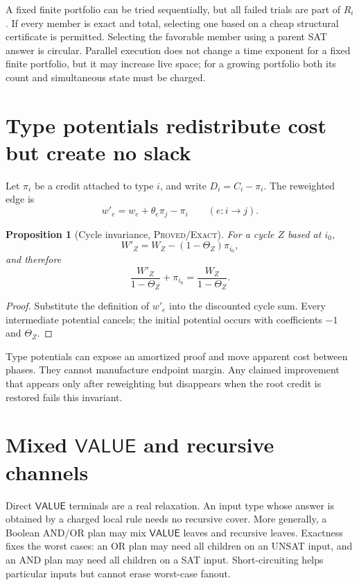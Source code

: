 \documentclass[11pt]{article}
\newtheorem{proposition}[theorem]{Proposition}
\newcommand{\VALUE}{\mathsf{VALUE}}
\begin{document}
A fixed finite portfolio can be tried sequentially, but all failed trials are
part of \(R_i\).  If every member is exact and total, selecting one based on
a cheap structural certificate is permitted.  Selecting the favorable member
using a parent SAT answer is circular.  Parallel execution does not change a
time exponent for a fixed finite portfolio, but it may increase live space;
for a growing portfolio both its count and simultaneous state must be charged.

\section{Type potentials redistribute cost but create no slack}

Let \(\pi_i\) be a credit attached to type \(i\), and write
\(D_i=C_i-\pi_i\).  The reweighted edge is
\[
 w'_e=w_e+\theta_e\pi_j-\pi_i
 \qquad(e:i\to j).
\]

\begin{proposition}[Cycle invariance, \textsc{Proved/Exact}]
For a cycle \(Z\) based at \(i_0\),
\[
 W'_Z=W_Z-(1-\Theta_Z)\pi_{i_0},
\]
and therefore
\[
 \frac{W'_Z}{1-\Theta_Z}+\pi_{i_0}
 =\frac{W_Z}{1-\Theta_Z}.
\]
\end{proposition}

\begin{proof}
Substitute the definition of \(w'_e\) into the discounted cycle sum.  Every
intermediate potential cancels; the initial potential occurs with
coefficients \(-1\) and \(\Theta_Z\).
\end{proof}

Type potentials can expose an amortized proof and move apparent cost between
phases.  They cannot manufacture endpoint margin.  Any claimed improvement
that appears only after reweighting but disappears when the root credit is
restored fails this invariant.

\section{Mixed \texorpdfstring{\(\VALUE\)}{VALUE} and recursive channels}

Direct \(\VALUE\) terminals are a real relaxation.  An input type whose
answer is obtained by a charged local rule needs no recursive cover.  More
generally, a Boolean AND/OR plan may mix \(\VALUE\) leaves and recursive
leaves.  Exactness fixes the worst cases: an OR plan may need all children on
an UNSAT input, and an AND plan may need all children on a SAT input.
Short-circuiting helps particular inputs but cannot erase worst-case fanout.
\end{document}
